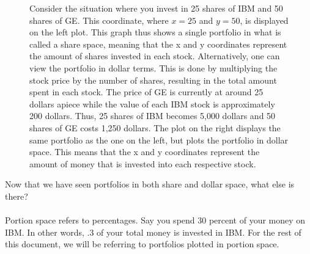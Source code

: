 \documentclass{article}\usepackage{graphicx, color}
\begin{document}
\begin{figure}[H]
\begin{subfigure}[b]{0.5\textwidth}
      \label{fig:dollarspace}
      \end{subfigure}
\caption{Consider the situation where you invest in 25 shares of IBM and 50 shares of GE. This coordinate, where $x = 25$ and $y = 50$, is displayed on the left plot. This graph thus shows a single portfolio in what is called a share space, meaning that the x and y coordinates represent the amount of shares invested in each stock. Alternatively, one can view the portfolio in dollar terms. This is done by multiplying the stock price by the number of shares, resulting in the total amount spent in each stock. The price of GE is currently at around 25 dollars apiece while the value of each IBM stock is approximately 200 dollars. Thus, 25 shares of IBM becomes 5,000 dollars and 50 shares of GE costs 1,250 dollars. The plot on the right displays the same portfolio as the one on the left, but plots the portfolio in dollar space. This means that the x and y coordinates represent the amount of money that is invested into each respective stock.}
\end{figure}

Now that we have seen portfolios in both share and dollar space, what else is there?
\\
\\
Portion space refers to percentages. Say you spend 30 percent of your money on IBM. In other words, .3 of your total money is invested in IBM. For the rest of this document, we will be referring to portfolios plotted in portion space.
\end{document}
